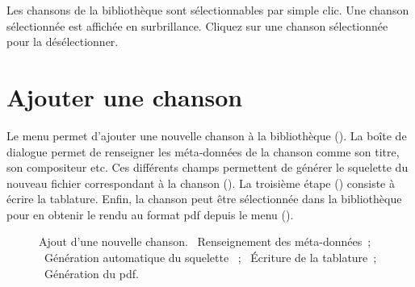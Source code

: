 Les chansons de la bibliothèque sont sélectionnables par simple clic.
Une chanson sélectionnée est affichée en surbrillance. Cliquez sur une
chanson sélectionnée pour la désélectionner.

\section{Ajouter une chanson}

Le menu  permet d'ajouter une
nouvelle chanson à la bibliothèque (). La boîte
de dialogue permet de renseigner les méta-données de la chanson comme
son titre, son compositeur etc. Ces différents champs permettent de
générer le squelette du nouveau fichier  correspondant à la
chanson (). La troisième étape
() consiste à écrire la tablature. Enfin, la
chanson peut être sélectionnée dans la bibliothèque pour en obtenir le
rendu au format pdf depuis le menu 
().

\begin{figure}
  \centering
  \hspace{0.1cm}%
  \hspace{0.1cm}%
  \hspace{0.1cm}%
  \caption{%
    Ajout d'une nouvelle chanson.
    ~Renseignement des méta-données~; %
    ~Génération automatique du squelette ~; %
    ~Écriture de la tablature~; %
    ~Génération du pdf.%
  }%
  \label{fig:new-song}
\end{figure}


